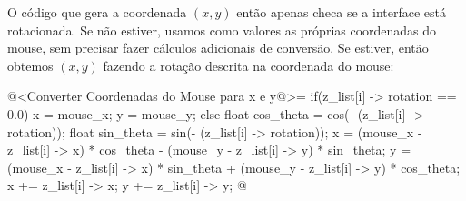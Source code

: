 O código que gera a coordenada $(x, y)$ então apenas checa se a
interface está rotacionada. Se não estiver, usamos como valores as
próprias coordenadas do mouse, sem precisar fazer cálculos adicionais
de conversão. Se estiver, então obtemos $(x, y)$ fazendo a rotação
descrita na coordenada do mouse:

\iniciocodigo
@<Converter Coordenadas do Mouse para x e y@>=
if(z_list[i] -> rotation == 0.0){
  x = mouse_x;
  y = mouse_y;
}
else{
 float cos_theta = cos(- (z_list[i] -> rotation));
 float sin_theta = sin(- (z_list[i] -> rotation));
 x = (mouse_x - z_list[i] -> x) * cos_theta -
       (mouse_y - z_list[i] -> y) * sin_theta;
 y = (mouse_x - z_list[i] -> x) * sin_theta +
       (mouse_y - z_list[i] -> y) * cos_theta;
 x +=  z_list[i] -> x;
 y +=  z_list[i] -> y;
}
@
\fimcodigo





\fim
